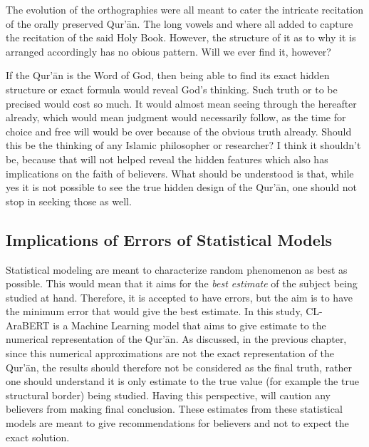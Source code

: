 The evolution of the orthographies were all meant to cater the intricate recitation of the orally preserved Qur'\=an. The long vowels and   where all added to capture the recitation of the said Holy Book. However, the structure of it as to why it is arranged accordingly has no obious pattern. Will we ever find it, however?

If the Qur'\=an is the Word of God, then being able to find its exact hidden structure or exact formula would reveal God's thinking. Such truth or   to be precised would cost so much. It would almost mean seeing through the hereafter already, which would mean judgment would necessarily follow, as the time for choice and free will would be over because of the obvious truth already. Should this be the thinking of any Islamic philosopher or researcher? I think it shouldn't be, because that will not helped reveal the hidden features which also has implications on the faith of believers. What should be understood is that, while yes it is not possible to see the true hidden design of the Qur'\=an, one should not stop in seeking those as well.

\subsection{Implications of Errors of Statistical Models}
Statistical modeling are meant to characterize random phenomenon as best as possible. This would mean that it aims for the \textit{best estimate} of the subject being studied at hand. Therefore, it is accepted to have errors, but the aim is to have the minimum error that would give the best estimate. In this study, CL-AraBERT is a Machine Learning model that aims to give estimate to the numerical representation of the Qur'\=an. As discussed, in the previous chapter, since this numerical approximations are not the exact representation of the Qur'\=an, the results should therefore not be considered as the final truth, rather one should understand it is only estimate to the true value (for example the true structural border) being studied. Having this perspective, will caution any believers from making final conclusion. These estimates from these statistical models are meant to give recommendations for believers and not to expect the exact solution.